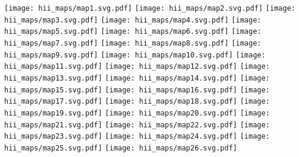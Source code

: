 \documentclass{article}
\begin{document}
\noindent
\texttt{[image: hii\_maps/map1.svg.pdf]}
\break
\break
\texttt{[image: hii\_maps/map2.svg.pdf]}
\texttt{[image: hii\_maps/map3.svg.pdf]}
\break
\break
\texttt{[image: hii\_maps/map4.svg.pdf]}
\texttt{[image: hii\_maps/map5.svg.pdf]}
\break
\break
\texttt{[image: hii\_maps/map6.svg.pdf]}
\texttt{[image: hii\_maps/map7.svg.pdf]}
\break
\break
\texttt{[image: hii\_maps/map8.svg.pdf]}
\texttt{[image: hii\_maps/map9.svg.pdf]}
\break
\break
\texttt{[image: hii\_maps/map10.svg.pdf]}
\texttt{[image: hii\_maps/map11.svg.pdf]}
\break
\break
\texttt{[image: hii\_maps/map12.svg.pdf]}
\texttt{[image: hii\_maps/map13.svg.pdf]}
\break
\break
\texttt{[image: hii\_maps/map14.svg.pdf]}
\texttt{[image: hii\_maps/map15.svg.pdf]}
\break
\break
\texttt{[image: hii\_maps/map16.svg.pdf]}
\texttt{[image: hii\_maps/map17.svg.pdf]}
\break
\break
\texttt{[image: hii\_maps/map18.svg.pdf]}
\texttt{[image: hii\_maps/map19.svg.pdf]}
\break
\break
\texttt{[image: hii\_maps/map20.svg.pdf]}
\texttt{[image: hii\_maps/map21.svg.pdf]}
\break
\break
\texttt{[image: hii\_maps/map22.svg.pdf]}
\texttt{[image: hii\_maps/map23.svg.pdf]}
\break
\break
\texttt{[image: hii\_maps/map24.svg.pdf]}
\texttt{[image: hii\_maps/map25.svg.pdf]}
\break
\break
\texttt{[image: hii\_maps/map26.svg.pdf]}
\end{document}
